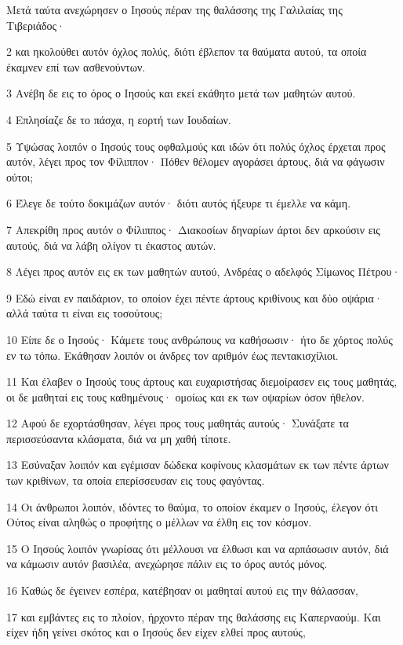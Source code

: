 \par Μετά ταύτα ανεχώρησεν ο Ιησούς πέραν της θαλάσσης της Γαλιλαίας της Τιβεριάδος·
\par 2 και ηκολούθει αυτόν όχλος πολύς, διότι έβλεπον τα θαύματα αυτού, τα οποία έκαμνεν επί των ασθενούντων.
\par 3 Ανέβη δε εις το όρος ο Ιησούς και εκεί εκάθητο μετά των μαθητών αυτού.
\par 4 Επλησίαζε δε το πάσχα, η εορτή των Ιουδαίων.
\par 5 Υψώσας λοιπόν ο Ιησούς τους οφθαλμούς και ιδών ότι πολύς όχλος έρχεται προς αυτόν, λέγει προς τον Φίλιππον· Πόθεν θέλομεν αγοράσει άρτους, διά να φάγωσιν ούτοι;
\par 6 Έλεγε δε τούτο δοκιμάζων αυτόν· διότι αυτός ήξευρε τι έμελλε να κάμη.
\par 7 Απεκρίθη προς αυτόν ο Φίλιππος· Διακοσίων δηναρίων άρτοι δεν αρκούσιν εις αυτούς, διά να λάβη ολίγον τι έκαστος αυτών.
\par 8 Λέγει προς αυτόν εις εκ των μαθητών αυτού, Ανδρέας ο αδελφός Σίμωνος Πέτρου·
\par 9 Εδώ είναι εν παιδάριον, το οποίον έχει πέντε άρτους κριθίνους και δύο οψάρια· αλλά ταύτα τι είναι εις τοσούτους;
\par 10 Είπε δε ο Ιησούς· Κάμετε τους ανθρώπους να καθήσωσιν· ήτο δε χόρτος πολύς εν τω τόπω. Εκάθησαν λοιπόν οι άνδρες τον αριθμόν έως πεντακισχίλιοι.
\par 11 Και έλαβεν ο Ιησούς τους άρτους και ευχαριστήσας διεμοίρασεν εις τους μαθητάς, οι δε μαθηταί εις τους καθημένους· ομοίως και εκ των οψαρίων όσον ήθελον.
\par 12 Αφού δε εχορτάσθησαν, λέγει προς τους μαθητάς αυτούς· Συνάξατε τα περισσεύσαντα κλάσματα, διά να μη χαθή τίποτε.
\par 13 Εσύναξαν λοιπόν και εγέμισαν δώδεκα κοφίνους κλασμάτων εκ των πέντε άρτων των κριθίνων, τα οποία επερίσσευσαν εις τους φαγόντας.
\par 14 Οι άνθρωποι λοιπόν, ιδόντες το θαύμα, το οποίον έκαμεν ο Ιησούς, έλεγον ότι Ούτος είναι αληθώς ο προφήτης ο μέλλων να έλθη εις τον κόσμον.
\par 15 Ο Ιησούς λοιπόν γνωρίσας ότι μέλλουσι να έλθωσι και να αρπάσωσιν αυτόν, διά να κάμωσιν αυτόν βασιλέα, ανεχώρησε πάλιν εις το όρος αυτός μόνος.
\par 16 Καθώς δε έγεινεν εσπέρα, κατέβησαν οι μαθηταί αυτού εις την θάλασσαν,
\par 17 και εμβάντες εις το πλοίον, ήρχοντο πέραν της θαλάσσης εις Καπερναούμ. Και είχεν ήδη γείνει σκότος και ο Ιησούς δεν είχεν ελθεί προς αυτούς,
